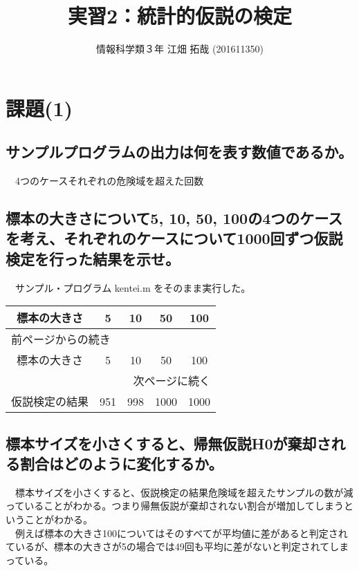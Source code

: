 \documentclass{scrartcl}
\author{情報科学類３年 江畑 拓哉 (201611350)}
\date{}
\title{実習2：統計的仮説の検定}
\begin{document}
\maketitle
\tableofcontents

\section{課題(1)}
\label{sec:orgc837445}
\subsection{サンプルプログラムの出力は何を表す数値であるか。}
\label{sec:orgfd2aa49}
　4つのケースそれぞれの危険域を超えた回数\\
\subsection{標本の大きさについて5, 10, 50, 100の4つのケースを考え、それぞれのケースについて1000回ずつ仮説検定を行った結果を示せ。}
\label{sec:orgcfbe6c1}
　サンプル・プログラム kentei.m をそのまま実行した。\\
\begin{longtable}{|c|c|c|c|c|}
\hline
標本の大きさ & 5 & 10 & 50 & 100\\
\hline
\endfirsthead
\multicolumn{5}{l}{前ページからの続き} \\
\hline

標本の大きさ & 5 & 10 & 50 & 100 \\

\hline
\endhead
\hline\multicolumn{5}{r}{次ページに続く} \\
\endfoot
\endlastfoot
\hline
仮説検定の結果 & 951 & 998 & 1000 & 1000\\
\hline
\end{longtable}
\subsection{標本サイズを小さくすると、帰無仮説H0が棄却される割合はどのように変化するか。}
\label{sec:orgfc06faf}
　標本サイズを小さくすると、仮説検定の結果危険域を超えたサンプルの数が減っていることがわかる。つまり帰無仮説が棄却されない割合が増加してしまうということがわかる。\\
　例えば標本の大きさ100についてはそのすべてが平均値に差があると判定されているが、標本の大きさが5の場合では49回も平均に差がないと判定されてしまっている。\\
\end{document}
